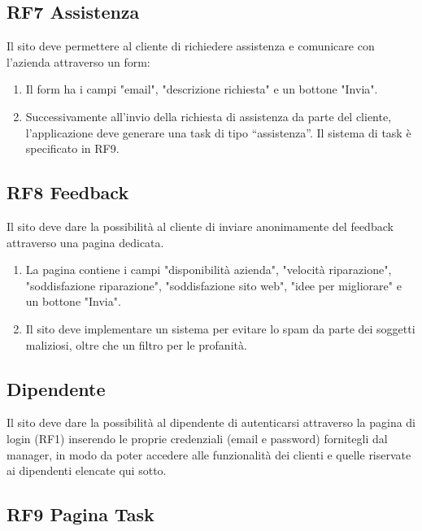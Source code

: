 \documentclass{report}
\begin{document}
\subsection*{RF7 Assistenza}
Il sito deve permettere al cliente di richiedere assistenza e comunicare con l'azienda attraverso un form:

\begin{enumerate}
	\item Il form ha i campi "email", "descrizione richiesta" e un bottone "Invia".
	
	\item Successivamente all’invio della richiesta di assistenza da parte del cliente, l’applicazione deve generare una task di tipo “assistenza”. Il sistema di task è specificato in RF9.
	
	
\end{enumerate}

\subsection*{RF8 Feedback}
Il sito deve dare la possibilità al cliente di inviare anonimamente del feedback attraverso una pagina dedicata.
\begin{enumerate}
	\item La pagina contiene i campi "disponibilità azienda", "velocità riparazione", "soddisfazione riparazione", "soddisfazione sito web", "idee per migliorare" e un bottone "Invia".
	
	\item Il sito deve implementare un sistema per evitare lo spam da parte dei soggetti maliziosi, oltre che un filtro  per le profanità.
	
\end{enumerate}

\subsection{Dipendente}
Il sito deve dare la possibilità al dipendente di autenticarsi attraverso la pagina di login (RF1) inserendo le proprie credenziali (email e password) fornitegli dal manager, in modo da poter accedere alle funzionalità dei clienti  e quelle riservate ai dipendenti elencate qui sotto.

\subsection*{RF9 Pagina Task}
\end{document}
